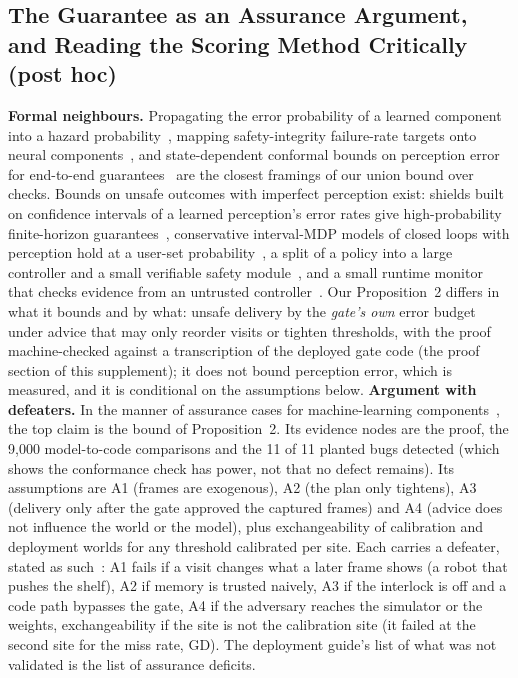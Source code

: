 \subsection{The Guarantee as an Assurance Argument, and Reading the Scoring Method Critically (post hoc)}\label{sec:moved-assure}
\textbf{Formal neighbours.} Propagating the error probability of a learned component into a hazard probability~\cite{kaindl2020probsafety}, mapping safety-integrity failure-rate targets onto neural components~\cite{lohn2020brittleness}, and state-dependent conformal bounds on perception error for end-to-end guarantees~\cite{waite2025conformalperception} are the closest framings of our union bound over checks. Bounds on unsafe outcomes with imperfect perception exist: shields built on confidence intervals of a learned perception's error rates give high-probability finite-horizon guarantees~\cite{scarbro2026intervalpomdp}, conservative interval-MDP models of closed loops with perception hold at a user-set probability~\cite{cleaveland2025conservative}, a split of a policy into a large controller and a small verifiable safety module~\cite{corsi2026fearl}, and a small runtime monitor that checks evidence from an untrusted controller~\cite{jackson2021certifiedcontrol}. Our Proposition~2 differs in what it bounds and by what: unsafe delivery by the \emph{gate's own} error budget under advice that may only reorder visits or tighten thresholds, with the proof machine-checked against a transcription of the deployed gate code (the proof section of this supplement); it does not bound perception error, which is measured, and it is conditional on the assumptions below.
\textbf{Argument with defeaters.} In the manner of assurance cases for machine-learning components~\cite{hawkins2021amlas}, the top claim is the bound of Proposition~2. Its evidence nodes are the proof, the 9{,}000 model-to-code comparisons and the 11 of 11 planted bugs detected (which shows the conformance check has power, not that no defect remains). Its assumptions are A1 (frames are exogenous), A2 (the plan only tightens), A3 (delivery only after the gate approved the captured frames) and A4 (advice does not influence the world or the model), plus exchangeability of calibration and deployment worlds for any threshold calibrated per site. Each carries a defeater, stated as such~\cite{gohar2026defeaters}: A1 fails if a visit changes what a later frame shows (a robot that pushes the shelf), A2 if memory is trusted naively, A3 if the interlock is off and a code path bypasses the gate, A4 if the adversary reaches the simulator or the weights, exchangeability if the site is not the calibration site (it failed at the second site for the miss rate, GD). The deployment guide's list of what was not validated is the list of assurance deficits.
